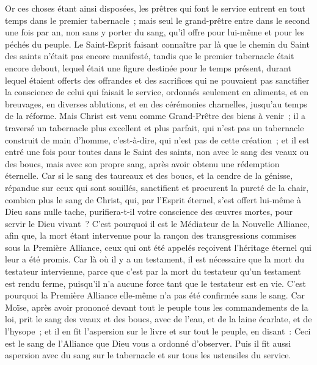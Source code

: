 \begin{multicols}{2}
Or ces choses étant ainsi disposées, les prêtres qui font le service entrent en tout temps dans le premier tabernacle~;
mais seul le grand-prêtre entre dans le second une fois par an, non sans y porter du sang, qu'il offre pour lui-même et pour les péchés du peuple.
Le Saint-Esprit faisant connaître par là que le chemin du Saint des saints n'était pas encore manifesté, tandis que le premier tabernacle était encore debout,
lequel était une figure destinée pour le temps présent, durant lequel étaient offerts des offrandes et des sacrifices qui ne pouvaient pas sanctifier la conscience de celui qui faisait le service,
ordonnés seulement en aliments, et en breuvages, en diverses ablutions, et en des cérémonies charnelles, jusqu'au temps de la réforme.
Mais Christ est venu comme Grand-Prêtre des biens à venir~; il a traversé un tabernacle plus excellent et plus parfait, qui n'est pas un tabernacle construit de main d'homme, c'est-à-dire, qui n'est pas de cette création~;
et il est entré une fois pour toutes dans le Saint des saints, non avec le sang des veaux ou des boucs, mais avec son propre sang, après avoir obtenu une rédemption éternelle.
Car si le sang des taureaux et des boucs, et la cendre de la génisse, répandue sur ceux qui sont souillés, sanctifient et procurent la pureté de la chair,
combien plus le sang de Christ, qui, par l'Esprit éternel, s'est offert lui-même à Dieu sans nulle tache, purifiera-t-il votre conscience des œuvres mortes, pour servir le Dieu vivant~?
C'est pourquoi il est le Médiateur de la Nouvelle Alliance, afin que, la mort étant intervenue pour la rançon des transgressions commises sous la Première Alliance, ceux qui ont été appelés reçoivent l'héritage éternel qui leur a été promis.
Car là où il y a un testament, il est nécessaire que la mort du testateur intervienne,
parce que c'est par la mort du testateur qu'un testament est rendu ferme, puisqu'il n'a aucune force tant que le testateur est en vie.
C'est pourquoi la Première Alliance elle-même n'a pas été confirmée sans le sang.
Car Moïse, après avoir prononcé devant tout le peuple tous les commandements de la loi, prit le sang des veaux et des boucs, avec de l'eau, et de la laine écarlate, et de l'hysope~; et il en fit l'aspersion sur le livre et sur tout le peuple, en disant~:
Ceci est le sang de l'Alliance que Dieu vous a ordonné d'observer.
Puis il fit aussi aspersion avec du sang sur le tabernacle et sur tous les ustensiles du service.

\end{multicols}
